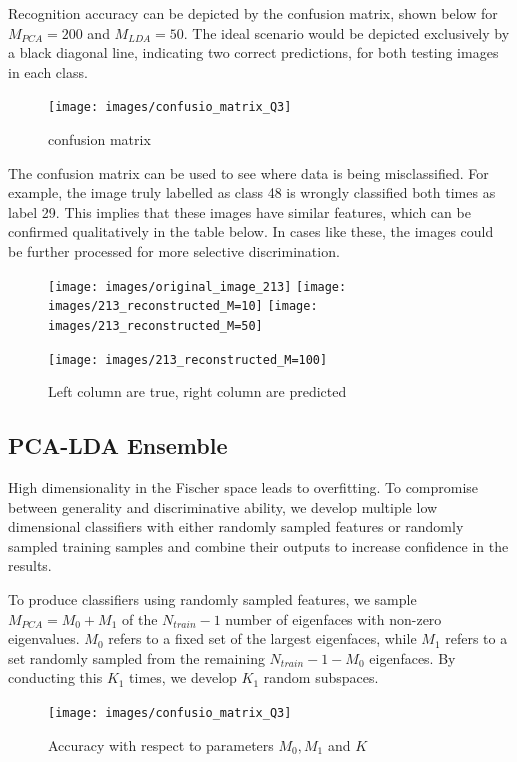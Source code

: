 \documentclass[10pt,twocolumn,letterpaper]{article}
\begin{document}
Recognition accuracy can be depicted by the confusion matrix, shown below for $M_{PCA}=200$ and $M_{LDA}=50$. The ideal scenario would be depicted exclusively by a black diagonal line, indicating two correct predictions, for both testing images in each class. 
\begin{figure}[h]
    \centering
    \texttt{[image: images/confusio\_matrix\_Q3]} 
    \caption{confusion matrix}   \label{fig:confusion_Q3}
\end{figure}
The confusion matrix can be used to see where data is being misclassified. For example, the image truly labelled as class 48 is wrongly classified both times as label 29. This implies that these images have similar features, which can be confirmed qualitatively in the table below. In cases like these, the images could be further processed for more selective discrimination. 

\begin{figure}[h]
    \centering
    \texttt{[image: images/original\_image\_213]} 
    \texttt{[image: images/213\_reconstructed\_M=10]}
    \texttt{[image: images/213\_reconstructed\_M=50]}
    
    \texttt{[image: images/213\_reconstructed\_M=100]}

    \caption{Left column are true, right column are predicted}
    \label{fig:predicted_faces}
\end{figure}

\subsection{PCA-LDA Ensemble}
High dimensionality in the Fischer space leads to overfitting. To compromise between generality and discriminative ability, we develop multiple low dimensional classifiers with either randomly sampled features or randomly sampled training samples and combine their outputs to increase confidence in the results. 

To produce classifiers using randomly sampled features, we sample $M_{PCA}=M_0+M_1$ of the $N_{train}-1$ number of eigenfaces with non-zero eigenvalues. $M_0$ refers to a fixed set of the largest eigenfaces, while $M_1$ refers to a set randomly sampled from the remaining $N_{train}-1-M_0$ eigenfaces. By conducting this $K_1$ times, we develop $K_1$ random subspaces. 
\begin{figure}[h]
    \centering
    \texttt{[image: images/confusio\_matrix\_Q3]} 
    \caption{Accuracy with respect to parameters $M_0, M_1$ and $K$}   \end{figure}
    
\end{document}
